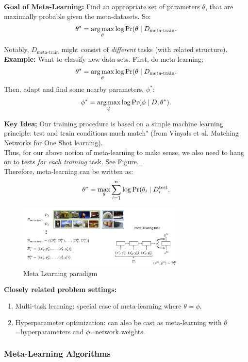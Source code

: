 {\bf Goal of Meta-Learning:} Find an appropriate set of parameters $\theta$, that are maximially probable given the meta-datasets. So:
\[
\theta^* = \operatorname*{arg\,max}_\theta \log \Pr(\theta \mid D_{\text{meta-train}}.
\]

Notably, $D_{\text{meta-train}}$ might consist of {\it different} tasks (with related structure). \\

{\bf Example:} Want to classify new data sets. First, do meta learning;
\[
\theta^* = \operatorname*{arg\,max}_\theta \log \Pr(\theta \mid D_{\text{meta-train}}.
\]
Then, adapt and find some nearby parameters, $\phi^*$:
\[
\phi^* = \operatorname*{arg\,max}_{\phi} \log \Pr(\phi \mid D, \theta^*).
\]


{\bf Key Idea;} Our training procedure is based on a simple machine learning principle: test and train conditions much match" (from Vinyals et al. Matching Networks for One Shot learning). \\

Thus, for our above notion of meta-learning to make sense, we also need to hang on to tests {\it for each training} task. See Figure. . \\

Therefore, meta-learning can be written as:
\[
\theta^* = \max_\theta \sum_{i = 1}^n \log \Pr(\theta_i \mid D_i^{\text{test}}.
\]

\begin{figure}
    \centering
    \includegraphics[width=0.75\textwidth]{images/meta_learn_1.jpg}
    \caption{Meta Learning paradigm}
    \label{fig:meta_learn}
\end{figure}

{\bf Closely related problem settings:}
\begin{enumerate}
\item Multi-task learning: special case of meta-learning where $\theta = \phi$.
\item Hyperparameter optimization: can also be cast as meta-learning with $\theta$=hyperparameters and $\phi$=network weights.
\end{enumerate}

\subsubsection{Meta-Learning Algorithms}

